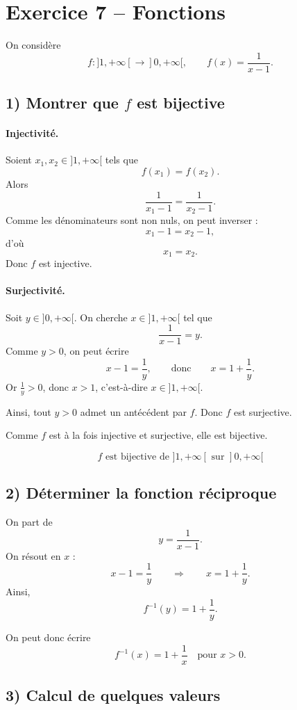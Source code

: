 \documentclass[12pt,a4paper]{article}
\begin{document}
\bigskip

\section*{Exercice 7 -- Fonctions}

On considère
\[
f: ]1,+\infty[ \longrightarrow ]0,+\infty[, \qquad f(x)=\frac{1}{x-1}.
\]

\subsection*{1) Montrer que $f$ est bijective}

\paragraph{Injectivité.}
Soient $x_1,x_2\in ]1,+\infty[$ tels que
\[
f(x_1)=f(x_2).
\]
Alors
\[
\frac{1}{x_1-1}=\frac{1}{x_2-1}.
\]
Comme les dénominateurs sont non nuls, on peut inverser :
\[
x_1-1=x_2-1,
\]
d'où
\[
x_1=x_2.
\]
Donc $f$ est injective.

\paragraph{Surjectivité.}
Soit $y\in ]0,+\infty[$. On cherche $x\in ]1,+\infty[$ tel que
\[
\frac{1}{x-1}=y.
\]
Comme $y>0$, on peut écrire
\[
x-1=\frac{1}{y},
\qquad \text{donc} \qquad
x=1+\frac{1}{y}.
\]
Or $\frac{1}{y}>0$, donc $x>1$, c'est-à-dire $x\in ]1,+\infty[$.

Ainsi, tout $y>0$ admet un antécédent par $f$. Donc $f$ est surjective.

Comme $f$ est à la fois injective et surjective, elle est bijective.

\[
\boxed{f\text{ est bijective de } ]1,+\infty[ \text{ sur } ]0,+\infty[}
\]

\subsection*{2) Déterminer la fonction réciproque}

On part de
\[
y=\frac{1}{x-1}.
\]
On résout en $x$ :
\[
x-1=\frac{1}{y}
\qquad\Longrightarrow\qquad
x=1+\frac{1}{y}.
\]
Ainsi,
\[
f^{-1}(y)=1+\frac{1}{y}.
\]

On peut donc écrire
\[
\boxed{f^{-1}(x)=1+\frac{1}{x}\quad \text{pour }x>0.}
\]

\subsection*{3) Calcul de quelques valeurs}
\end{document}
